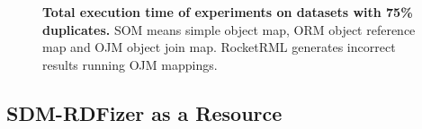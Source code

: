 \begin{figure}[!tb]
 \centering
    \qquad
\caption[Execution time for with 75\% duplicates]{{\bf Total execution time of experiments on datasets with 75\% duplicates.}  SOM means simple object map, ORM object reference map and OJM object join map. RocketRML generates incorrect results running OJM mappings.}
\label{fig:75percent}
\end{figure}
\subsection{SDM-RDFizer as a Resource}

